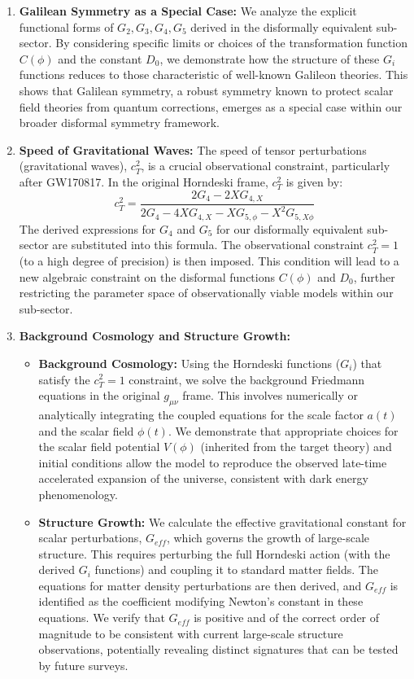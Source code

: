 \documentclass[twocolumn]{aastex631}
\begin{document}
\begin{enumerate}
    \item \textbf{Galilean Symmetry as a Special Case:} We analyze the explicit functional forms of $G_2, G_3, G_4, G_5$ derived in the disformally equivalent sub-sector. By considering specific limits or choices of the transformation function $C(\phi)$ and the constant $D_0$, we demonstrate how the structure of these $G_i$ functions reduces to those characteristic of well-known Galileon theories. This shows that Galilean symmetry, a robust symmetry known to protect scalar field theories from quantum corrections, emerges as a special case within our broader disformal symmetry framework.

    \item \textbf{Speed of Gravitational Waves:} The speed of tensor perturbations (gravitational waves), $c_T^2$, is a crucial observational constraint, particularly after GW170817. In the original Horndeski frame, $c_T^2$ is given by:
    \begin{equation}
    c_T^2 = \frac{2G_4 - 2XG_{4,X}}{2G_4 - 4XG_{4,X} - XG_{5,\phi} - X^2 G_{5,X\phi}}
    \end{equation}
    The derived expressions for $G_4$ and $G_5$ for our disformally equivalent sub-sector are substituted into this formula. The observational constraint $c_T^2 = 1$ (to a high degree of precision) is then imposed. This condition will lead to a new algebraic constraint on the disformal functions $C(\phi)$ and $D_0$, further restricting the parameter space of observationally viable models within our sub-sector.

    \item \textbf{Background Cosmology and Structure Growth:}
    \begin{itemize}
        \item \textbf{Background Cosmology:} Using the Horndeski functions ($G_i$) that satisfy the $c_T^2=1$ constraint, we solve the background Friedmann equations in the original $g_{\mu\nu}$ frame. This involves numerically or analytically integrating the coupled equations for the scale factor $a(t)$ and the scalar field $\phi(t)$. We demonstrate that appropriate choices for the scalar field potential $V(\phi)$ (inherited from the target theory) and initial conditions allow the model to reproduce the observed late-time accelerated expansion of the universe, consistent with dark energy phenomenology.
        \item \textbf{Structure Growth:} We calculate the effective gravitational constant for scalar perturbations, $G_{eff}$, which governs the growth of large-scale structure. This requires perturbing the full Horndeski action (with the derived $G_i$ functions) and coupling it to standard matter fields. The equations for matter density perturbations are then derived, and $G_{eff}$ is identified as the coefficient modifying Newton's constant in these equations. We verify that $G_{eff}$ is positive and of the correct order of magnitude to be consistent with current large-scale structure observations, potentially revealing distinct signatures that can be tested by future surveys.
    \end{itemize}
\end{enumerate}
\end{document}
